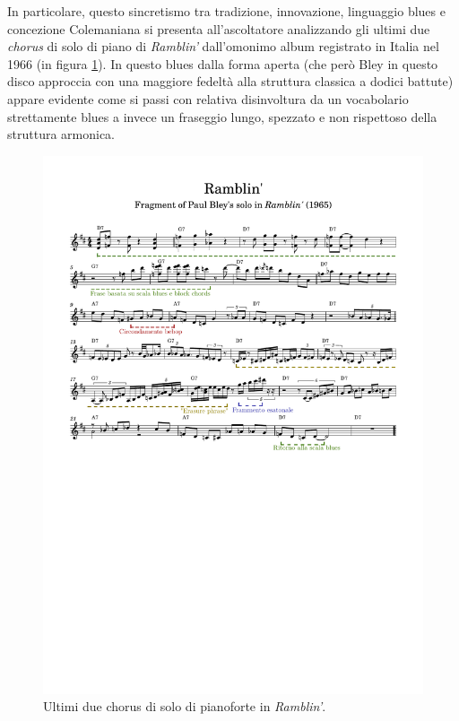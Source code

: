 In particolare, questo sincretismo tra tradizione, innovazione, linguaggio blues e concezione Colemaniana si presenta all'ascoltatore analizzando gli ultimi due \textit{chorus} di solo di piano di \textit{Ramblin'} dall'omonimo album registrato in Italia nel 1966 (in figura \ref{fig:ramblin}). In questo blues dalla forma aperta (che però Bley in questo disco approccia con una maggiore fedeltà alla struttura classica a dodici battute) appare evidente come si passi con relativa disinvoltura da un vocabolario strettamente blues a invece un fraseggio lungo, spezzato e non rispettoso della struttura armonica. \par 
\begin{figure}[h]
	\centering
	\includegraphics[clip,trim=1cm 13cm 1cm 3.5cm, width=\textwidth]{ramblin analysis.pdf}
	\caption{Ultimi due chorus di solo di pianoforte in \textit{Ramblin'}.}
	\label{fig:ramblin}
\end{figure}
